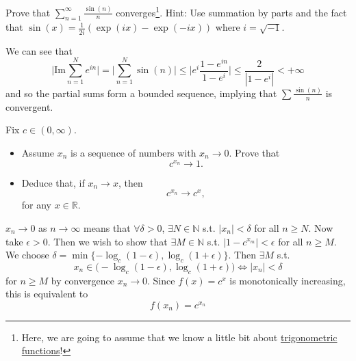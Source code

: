   \begin{exercise}
    Prove that $\sum_{n=1}^{\infty} \frac{\sin(n)}{n}$ converges\footnote{Here, we are going to assume that we know a little bit about \hyperref[def:trigonometric-functions]{trigonometric functions}!}. Hint: Use summation by parts and the fact that $\sin(x) = \frac{1}{2i}(\exp(ix) - \exp(-ix))$ where $i = \sqrt{-1}$.
  \end{exercise}
  \begin{solution}
    We can see that 
    \begin{equation}
      \bigg| \mathrm{Im} \sum_{n=1}^N e^{in} \bigg| = \bigg| \sum_{n=1}^N \sin(n) \bigg| \leq \bigg| e^i \frac{1 - e^{in}}{1 - e^i} \bigg| \leq \frac{2}{|1 - e^i|} < +\infty
    \end{equation} 
    and so the partial sums form a bounded sequence, implying that $\sum \frac{\sin(n)}{n}$ is convergent. 
  \end{solution}

  \begin{exercise}
    Fix $c \in (0, \infty)$.
    \begin{itemize}
      \item Assume $x_n$ is a sequence of numbers with $x_n \to 0$. Prove that
        \begin{equation}
          c^{x_n} \to 1.
        \end{equation}
      
      \item Deduce that, if $x_n \to x$, then
        \begin{equation}
          c^{x_n} \to c^x,
        \end{equation}
        for any $x \in \mathbb{R}$.
    \end{itemize}
  \end{exercise}
  \begin{solution}
    $x_n \to 0$ as $n \to \infty$ means that $\forall \delta > 0$, $\exists N \in \mathbb{N}$ s.t. $|x_n| < \delta$ for all $n \geq N$. Now take $\epsilon > 0$. Then we wish to show that $\exists M \in \mathbb{N}$ s.t. $|1 - c^{x_m}| < \epsilon$ for all $n \geq M$. We choose $\delta = \min\{-\log_c (1 - \epsilon), \log_c (1 + \epsilon)\}$. Then $\exists M$ s.t. 
    \begin{equation}
      x_n \in \big( -\log_c (1 - \epsilon), \log_c (1 + \epsilon) \big) \iff |x_n| < \delta
    \end{equation}
    for $n \geq M$ by convergence $x_n \to 0$. Since $f(x) = c^x$ is monotonically increasing, this is equivalent to 
    \begin{equation}
      f(x_n) = c^{x_n}
    \end{equation}
  \end{solution}

